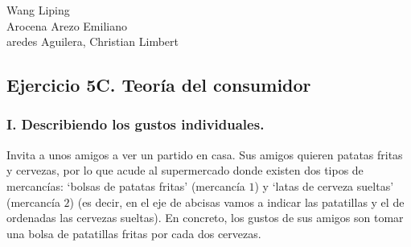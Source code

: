 Wang Liping\\
Arocena Arezo Emiliano\\
aredes Aguilera, Christian Limbert\\

\subsection*{\center Ejercicio 5C. Teoría del consumidor}
\vspace{1cm}

\subsubsection*{\center I. Describiendo los gustos individuales.}
\vspace{.5cm}

Invita a unos amigos a ver un partido en casa. Sus amigos quieren patatas fritas y cervezas, por lo que acude al supermercado donde existen dos tipos de mercancías: $‘$bolsas de patatas fritas$’$ (mercancía $1$) y $‘$latas de cerveza sueltas$’$ (mercancía $2$) (es decir, en el eje de abcisas vamos a indicar las patatillas y el de ordenadas las cervezas sueltas). En concreto, los gustos de sus amigos son tomar una bolsa de patatillas fritas por cada dos cervezas.\\\\

